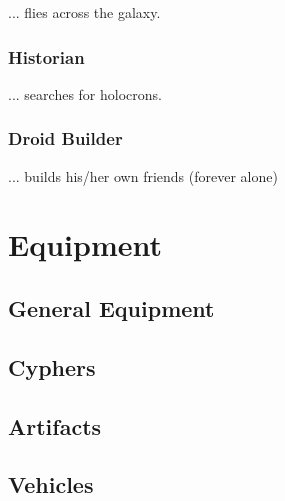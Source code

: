 \documentclass[a4paper,10pt,final,twocolumn,oneside]{book}
\begin{document}
... flies across the galaxy.


\clearpage

\subsection{Historian} %
\label{sub:historian}

... searches for holocrons.


\clearpage

\subsection{Droid Builder} %
\label{sub:droid_builder}

... builds his/her own friends (forever alone)




\clearpage

\chapter{Equipment} %
\label{cha:equipment}

\section{General Equipment} %
\label{sec:general_equipment}


\clearpage

\section{Cyphers} %
\label{sec:cyphers}


\clearpage

\section{Artifacts} %
\label{sec:artifacts}


\clearpage

\section{Vehicles} %
\label{sec:vehicles}


\clearpage


\end{document}
